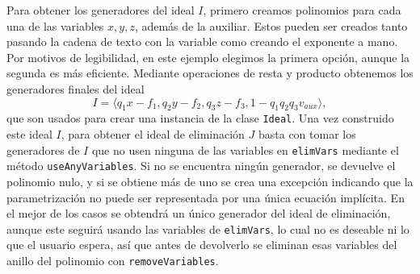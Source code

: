 Para obtener los generadores del ideal $I$, primero creamos polinomios para cada una de las variables $x,y,z$, además de la auxiliar. Estos pueden ser creados tanto pasando la cadena de texto con la variable como creando el exponente a mano. Por motivos de legibilidad, en este ejemplo elegimos la primera opción, aunque la segunda es más eficiente. Mediante operaciones de resta y producto obtenemos los generadores finales del ideal
$$I = \langle q_1x - f_1, q_2y - f_2, q_3z - f_3, 1 - q_1q_2q_3v_{aux}\rangle,$$
que son usados para crear una instancia de la clase \texttt{Ideal}. Una vez construido este ideal $I$, para obtener el ideal de eliminación $J$ basta con tomar los generadores de $I$ que no usen ninguna de las variables en \texttt{elimVars} mediante el método \texttt{useAnyVariables}. Si no se encuentra ningún generador, se devuelve el polinomio nulo, y si se obtiene más de uno se crea una excepción indicando que la parametrización no puede ser representada por una única ecuación implícita. En el mejor de los casos se obtendrá un único generador del ideal de eliminación, aunque este seguirá usando las variables de \texttt{elimVars}, lo cual no es deseable ni lo que el usuario espera, así que antes de devolverlo se eliminan esas variables del anillo del polinomio con \texttt{removeVariables}.\newline

